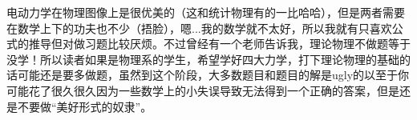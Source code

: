 \documentclass[14pt,oneside]{book}
\begin{document}
\begin{large}
电动力学在物理图像上是很优美的（这和统计物理有的一比哈哈），但是两者需要在数学上下的功夫也不少（捂脸），嗯...我的数学就不太好，所以我就有只喜欢公式的推导但对做习题比较厌烦。不过曾经有一个老师告诉我，理论物理不做题等于没学！所以读者如果是物理系的学生，希望学好四大力学，打下理论物理的基础的话可能还是要多做题，虽然到这个阶段，大多数题目和题目的解是ugly的以至于你可能花了很久很久因为一些数学上的小失误导致无法得到一个正确的答案，但是还是不要做“美好形式的奴隶”。







\end{large}
\end{document}
